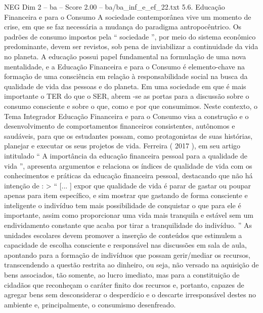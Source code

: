 \begin{textsample}{NEG Dim 2 – ba – Score 2.00 – ba/ba\_inf\_e\_ef\_22.txt}  \label{ex:f2_neg_260}
5.6.
Educação Financeira e para o Consumo A sociedade contemporânea vive um momento de crise, em que se faz necessária a mudança do paradigma antropocêntrico.
Os padrões de consumo impostos pela “ sociedade ”, por meio do sistema econômico predominante, devem ser revistos, sob pena de inviabilizar a continuidade da vida no planeta.
A educação possui papel fundamental na formulação de uma nova mentalidade, e a Educação Financeira e para o Consumo é elemento-chave na formação de uma consciência em relação à responsabilidade social na busca da qualidade de vida das pessoas e do planeta.
Em uma sociedade em que é mais importante o TER do que o SER, abrem -se as portas para a discussão sobre o consumo consciente e sobre o que, como e por que consumimos.
Neste contexto, o Tema Integrador Educação Financeira e para o Consumo visa a construção e o desenvolvimento de comportamentos financeiros consistentes, autônomos e saudáveis, para que os estudantes possam, como protagonistas de suas histórias, planejar e executar os seus projetos de vida.
Ferreira ( 2017 ), em seu artigo intitulado “ A importância da educação financeira pessoal para a qualidade de vida ”, apresenta argumentos e relaciona os índices de qualidade de vida com os conhecimentos e práticas da educação financeira pessoal, destacando que não há intenção de : > “ [... ] expor que qualidade de vida é parar de gastar ou poupar apenas para item específico, e sim mostrar que gastando de forma consciente e inteligente o indivíduo tem mais possibilidade de conquistar o que para ele é importante, assim como proporcionar uma vida mais tranquila e estável sem um endividamento constante que acaba por tirar a tranquilidade do indivíduo. ” As unidades escolares devem promover a inserção de conteúdos que estimulem a capacidade de escolha consciente e responsável nas discussões em sala de aula, apontando para a formação de indivíduos que possam gerir/mediar os recursos, transcendendo a questão restrita ao dinheiro, ou seja, não versado na aquisição de bens associados, tão somente, ao lucro imediato, mas para a constituição de cidadãos que reconheçam o caráter finito dos recursos e, portanto, capazes de agregar bens sem desconsiderar o desperdício e o descarte irresponsável destes no ambiente e, principalmente, o consumismo desenfreado.

\end{textsample}
